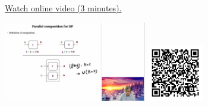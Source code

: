 
\begin{minipage}{10cm}
    \href{https://act4e-spring21.netlify.app/videos/spring2021-functorial-comp-a:solving-queries:solving-parallel.html}{Watch online video (3 minutes).}
        
    \href{https://act4e-spring21.netlify.app/videos/spring2021-functorial-comp-a:solving-queries:solving-parallel.html}{\includegraphics[height=3.5cm]{spring2021-functorial-comp-a:solving-queries:solving-parallel/thumbnails.jpg}}
    \href{https://act4e-spring21.netlify.app/videos/spring2021-functorial-comp-a:solving-queries:solving-parallel.html}{\includegraphics[height=2.5cm]{spring2021-functorial-comp-a:solving-queries:solving-parallel/qrcode.png}}
\end{minipage}
